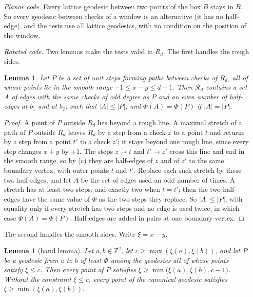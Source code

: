 \documentclass[11pt]{amsart}
\newtheorem{lemma}[theorem]{Lemma}
\theoremstyle{definition}
\theoremstyle{remark}
\numberwithin{equation}{section}
\begin{document}
\emph{Planar code.} Every lattice geodesic between two points of the box $B$ stays in $B$. So every geodesic between
checks of a window is an alternative (it has no half-edge), and the tests use all lattice geodesics, with no condition
on the position of the window.

\emph{Rotated code.} Two lemmas make the tests valid in $R_d$. The first handles the rough sides.

\begin{lemma}\label{cnt:lem-rough}
Let $P$ be a set of unit steps forming paths between checks of $R_d$, all of whose points lie in the smooth range
$-1\le x-y\le d-1$. Then $\mathcal R_d$ contains a set $A$ of edges with the same checks of odd degree as $P$ and an
even number of half-edges at $b_1$ and at $b_2$, such that $|A|\le|P|$, and $\Phi(A)=\Phi(P)$ if $|A|=|P|$.
\end{lemma}

\begin{proof}
A point of $P$ outside $R_d$ lies beyond a rough line. A maximal stretch of a path of $P$ outside $R_d$ leaves $R_d$ by
a step from a check $z$ to a point $t$ and returns by a step from a point $t'$ to a check $z'$; it stays beyond one
rough line, since every step changes $x+y$ by $\pm1$. The steps $z\to t$ and $t'\to z'$ cross this line and end in the
smooth range, so by (c) they are half-edges of $z$ and of $z'$ to the same boundary vertex, with outer points $t$ and
$t'$. Replace each such stretch by these two half-edges, and let $A$ be the set of edges used an odd number of times.
A stretch has at least two steps, and exactly two when $t=t'$; then the two half-edges have the same value of $\Phi$
as the two steps they replace. So $|A|\le|P|$, with equality only if every stretch has two steps and no edge is used
twice, in which case $\Phi(A)=\Phi(P)$. Half-edges are added in pairs at one boundary vertex.
\end{proof}

The second handles the smooth sides. Write $\xi=x-y$.

\begin{lemma}[band lemma]\label{cnt:lem-band}
Let $a,b\in\mathbb Z^2$, let $c\ge\max(\xi(a),\xi(b))$, and let $P$ be a geodesic from $a$ to $b$ of least $\Phi$
among the geodesics all of whose points satisfy $\xi\le c$. Then every point of $P$ satisfies
$\xi\ge\min\bigl(\xi(a),\xi(b),c-1\bigr)$. Without the constraint $\xi\le c$, every point of the canonical geodesic
satisfies $\xi\ge\min(\xi(a),\xi(b))$.
\end{lemma}
\end{document}
